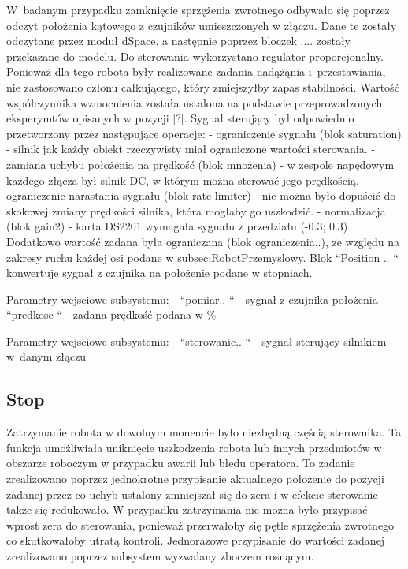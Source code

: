 W~badanym przypadku zamknięcie sprzężenia zwrotnego odbywało się poprzez odczyt położenia kątowego z czujników umieszczonych w złączu. Dane te zostały odczytane przez moduł dSpace, a następnie poprzez bloczek .... zostały przekazane do modelu. Do sterowania wykorzystano regulator proporcjonalny. Ponieważ dla tego robota były realizowane zadania nadążąnia i~przestawiania, nie zastosowano członu całkującego, który zmiejszyłby zapas stabilności. Wartość współczynnika wzmocnienia została ustalona na podstawie przeprowadzonych eksperymtów opisanych w pozycji [?]. %
Sygnał sterujący był odpowiednio przetworzony przez następujące operacje:
- ograniczenie sygnału (blok saturation) - silnik jak każdy obiekt rzeczywisty miał ograniczone wartości sterowania.
- {} zamiana uchybu położenia na prędkość {} (blok mnożenia) - w zespole napędowym każdego złącza był silnik DC, w którym można sterować jego prędkością.
- ograniczenie narastania sygnału (blok rate-limiter) - nie można było dopuścić do skokowej zmiany prędkości silnika, która mogłaby go uszkodzić.
- normalizacja (blok gain2) -  karta DS2201 wymagała sygnału z przedziału (-0.3; 0.3)
Dodatkowo wartość zadana była ograniczana (blok ograniczenia..), ze względu na zakresy ruchu każdej osi podane w {subsec:RobotPrzemyslowy}.
Blok ``Position .. `` konwertuje sygnał z czujnika na położenie podane w stopniach.

Parametry wejsciowe subsystemu:
- ``pomiar.. `` - sygnał z czujnika położenia
- ``predkosc `` - zadana prędkość podana w \%

Parametry wejsciowe subsystemu:
- ``sterowanie.. `` - sygnał sterujący silnikiem w~danym złączu 

\subsection{Stop}
\label{subsec:Stop}

Zatrzymanie robota w dowolnym monencie było niezbędną częścią sterownika. Ta funkcja umożliwiała uniknięcie uszkodzenia robota lub innych przedmiotów w obszarze roboczym w przypadku awarii lub błedu operatora. To zadanie zrealizowano poprzez jednokrotne przypisanie aktualnego położenie do pozycji zadanej przez co uchyb ustalony zmniejszał się do zera i w efekcie sterowanie także się redukowało. W przypadku zatrzymania nie można było przypisać wprost zera do sterowania, ponieważ przerwałoby się pętle sprzężenia zwrotnego co skutkowałoby utratą kontroli.
Jednorazowe przypisanie do wartości zadanej zrealizowano poprzez subsystem wyzwalany zboczem rosnącym.


